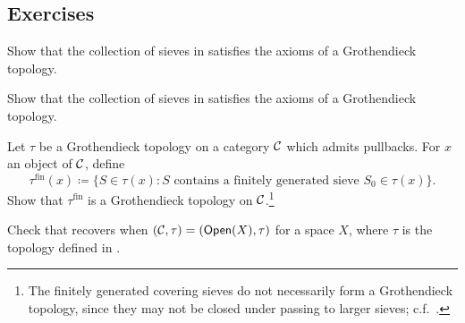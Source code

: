 
\subsection*{Exercises}

\begin{exercise}\label{exercise:chap:sheaves:sec:sites:open cover topology is a topology}
    Show that the collection of sieves in  satisfies the axioms of a Grothendieck topology.
\end{exercise}

\begin{exercise}\label{exercise:chap:sheaves:sec:sites:jointly surjective topology is a topology}
    Show that the collection of sieves in  satisfies the axioms of a Grothendieck topology.
\end{exercise}

\begin{exercise}\label{exercise:chap:sheaves:sec:sites:finitary topology}
    Let $\tau$ be a Grothendieck topology on a category $\mathcal{C}$ which admits pullbacks. For $x$ an object of $\mathcal{C}$, define
    \[\tau^{\mathrm{fin}} (x) \coloneq \{S \in \tau(x) : S \text{ contains a finitely generated sieve } S_0 \in \tau(x)\}.\]
    Show that $\tau^{\mathrm{fin}}$ is a Grothendieck topology on $\mathcal{C}$.\footnote{The finitely generated covering sieves do not necessarily form a Grothendieck topology, since they may not be closed under passing to larger sieves; c.f.\ .}
\end{exercise}

\begin{exercise}\label{exercise:chap:sheaves:sec:sites:sheaves on OpenX recover sheaves on X}
    Check that  recovers  when $(\mathcal{C}, \tau) = (\mathsf{Open}(X), \tau)$ for a space $X$, where $\tau$ is the topology defined in .
\end{exercise}

